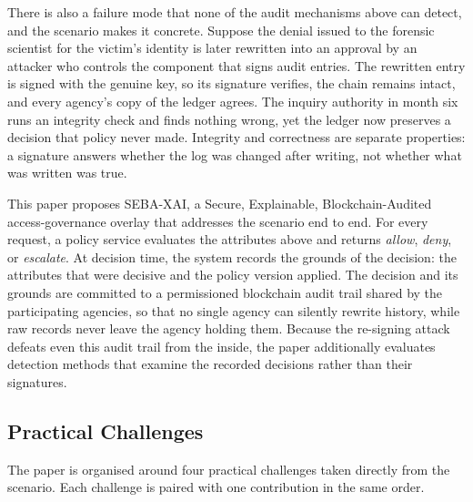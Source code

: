 There is also a failure mode that none of the audit mechanisms above can
detect, and the scenario makes it concrete. Suppose the denial issued to the
forensic scientist for the victim's identity is later rewritten into an
approval by an attacker who controls the component that signs audit entries.
The rewritten entry is signed with the genuine key, so its signature
verifies, the chain remains intact, and every agency's copy of the ledger
agrees. The inquiry authority in month six runs an integrity check and finds
nothing wrong, yet the ledger now preserves a decision that policy never
made. Integrity and correctness are separate properties: a signature answers
whether the log was changed after writing, not whether what was written was
true.

This paper proposes SEBA-XAI, a Secure, Explainable, Blockchain-Audited
access-governance overlay that addresses the scenario end to end. For every
request, a policy service evaluates the attributes above and returns
\emph{allow}, \emph{deny}, or \emph{escalate}. At decision time, the system
records the grounds of the decision: the attributes that were decisive and
the policy version applied. The decision and its grounds are committed to a
permissioned blockchain audit trail shared by the participating agencies, so
that no single agency can silently rewrite history, while raw records never
leave the agency holding them. Because the re-signing attack defeats even
this audit trail from the inside, the paper additionally evaluates detection
methods that examine the recorded decisions rather than their signatures.

\subsection{Practical Challenges}

The paper is organised around four practical challenges taken directly from
the scenario. Each challenge is paired with one contribution in the same
order.

